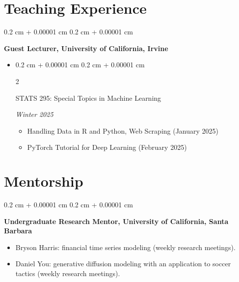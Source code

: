\documentclass[10pt, letterpaper]{article}
\newenvironment{highlights}{
    \begin{itemize}[
        topsep=0.10 cm,
        parsep=0.10 cm,
        partopsep=0pt,
        itemsep=0pt,
        leftmargin=0.4 cm + 10pt
    ]
}{
    \end{itemize}
} %
\newenvironment{highlightsforbulletentries}{
    \begin{itemize}[
        topsep=0.10 cm,
        parsep=0.10 cm,
        partopsep=0pt,
        itemsep=0pt,
        leftmargin=10pt
    ]
}{
    \end{itemize}
} %
\newenvironment{onecolentry}{
    \begin{adjustwidth}{
        0.2 cm + 0.00001 cm
    }{
        0.2 cm + 0.00001 cm
    }
}{
    \end{adjustwidth}
} %
\newenvironment{twocolentry}[2][]{
    \onecolentry
    \def\secondColumn{#2}
    \setcolumnwidth{\fill, 4.5 cm}
    \begin{paracol}{2}
}{
    \switchcolumn \raggedleft \secondColumn
    \end{paracol}
    \endonecolentry
} %
\begin{document}
\vspace{-0.0cm}

\section{Teaching Experience}
    \begin{onecolentry}
        \textbf{Guest Lecturer, University of California, Irvine}
        \begin{highlights}
            \item \begin{twocolentry}{\textit{Winter 2025}}
                    STATS 295: Special Topics in Machine Learning
                  \end{twocolentry}
            \begin{highlightsforbulletentries}
                \item Handling Data in R and Python, Web Scraping (January 2025)
                \item PyTorch Tutorial for Deep Learning (February 2025)
            \end{highlightsforbulletentries}
        \end{highlights}
    \end{onecolentry}

\vspace{-0.0cm}

\section{Mentorship}
    \begin{onecolentry}
        \textbf{Undergraduate Research Mentor, University of California, Santa Barbara}
        \begin{highlights}
            \item Bryson Harris: financial time series modeling (weekly research meetings).
            \item Daniel You: generative diffusion modeling with an application to soccer tactics (weekly research meetings).
        \end{highlights}
    \end{onecolentry}


            
\end{document}
